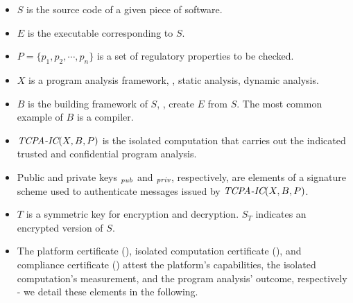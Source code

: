 \begin{itemize}[leftmargin=*]
\item $S$ is the source code of a given piece of software.

\item $E$ is the executable corresponding to $S$.

\item $P=\{p_1, p_2, \cdots, p_n\}$ is a set of regulatory properties to be checked.

\item $X$ is a program analysis framework, \eg, static analysis, dynamic analysis. 

\item $B$ is the building framework of $S$, \ie, create $E$ from $S$. The most common example of 
$B$ is a compiler.

\item $\textit{TCPA-IC}{}(X,B,P)$ is the isolated computation that carries out the indicated trusted and confidential program analysis.

\item Public and private keys \IC{}$_{\textit{pub}{}}$ and \IC{}$_{\textit{priv}{}}$, respectively, are elements of a signature scheme used to authenticate messages issued by $\textit{TCPA-IC}{}(X,B,P)$. 

\item $T$ is a symmetric key for encryption and decryption. $S_T$ indicates an encrypted version of $S$.

\item The platform certificate (\PC{}), isolated computation certificate (\ICC{}), and compliance certificate (\CC{}) attest the platform's capabilities, the isolated computation's measurement, and the program analysis' outcome, respectively - we detail these elements in the following.

%
%
%
%


\end{itemize}
